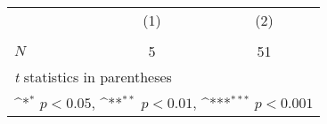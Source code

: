 {
\def\sym#1{\ifmmode^{#1}\else\(^{#1}\)\fi}
\begin{tabular}{l*{2}{c}}
\hline\hline
            &\multicolumn{1}{c}{(1)}&\multicolumn{1}{c}{(2)}\\
            &\multicolumn{1}{c}{} &\multicolumn{1}{c}{} \\
\hline
\hline
\(N\)       &           5         &          51         \\
\hline\hline
\multicolumn{3}{l}{\footnotesize \textit{t} statistics in parentheses}\\
\multicolumn{3}{l}{\footnotesize \sym{*} \(p<0.05\), \sym{**} \(p<0.01\), \sym{***} \(p<0.001\)}\\
\end{tabular}
}
